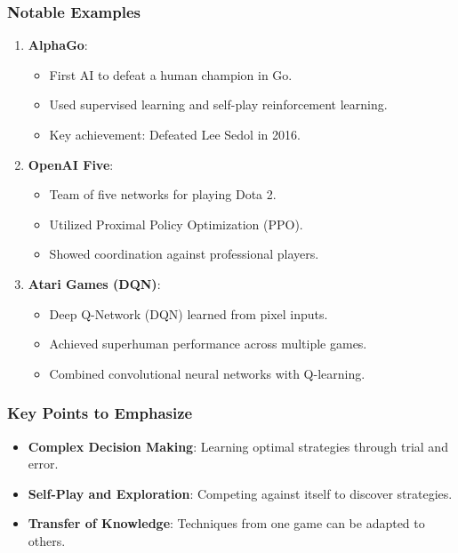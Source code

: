 \documentclass[aspectratio=169]{beamer}
\begin{document}
\begin{frame}[fragile]
    \frametitle{Notable Examples}
    \begin{enumerate}
        \item \textbf{AlphaGo}:
            \begin{itemize}
                \item First AI to defeat a human champion in Go.
                \item Used supervised learning and self-play reinforcement learning.
                \item Key achievement: Defeated Lee Sedol in 2016.
            \end{itemize}
            
        \item \textbf{OpenAI Five}:
            \begin{itemize}
                \item Team of five networks for playing Dota 2.
                \item Utilized Proximal Policy Optimization (PPO).
                \item Showed coordination against professional players.
            \end{itemize}
        \item \textbf{Atari Games (DQN)}:
            \begin{itemize}
                \item Deep Q-Network (DQN) learned from pixel inputs.
                \item Achieved superhuman performance across multiple games.
                \item Combined convolutional neural networks with Q-learning.
            \end{itemize}
    \end{enumerate}
\end{frame}

\begin{frame}[fragile]
    \frametitle{Key Points to Emphasize}
    \begin{itemize}
        \item \textbf{Complex Decision Making}: Learning optimal strategies through trial and error.
        \item \textbf{Self-Play and Exploration}: Competing against itself to discover strategies.
        \item \textbf{Transfer of Knowledge}: Techniques from one game can be adapted to others.
    \end{itemize}
\end{frame}
\end{document}
